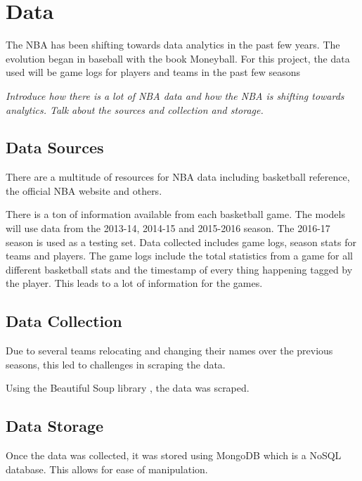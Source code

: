 \chapter{Data}\label{chapter:data}

The NBA has been shifting towards data analytics in the past few years.  The evolution began in baseball with the book Moneyball.  For this project, the data used will be game logs for players and teams in the past few seasons

\textit{Introduce how there is a lot of NBA data and how the NBA is shifting towards analytics.  Talk about the sources and collection and storage.}

\section{Data Sources}
There are a multitude of resources for NBA data including basketball reference, the official NBA website and others.

There is a ton of information available from each basketball game.  The models will use data from the 2013-14, 2014-15 and 2015-2016 season.  The 2016-17 season is used as a testing set.  Data collected includes game logs, season stats for teams and players.  The game logs include the total statistics from a game for all different basketball stats and the timestamp of every thing happening tagged by the player.  This leads to a lot of information for the games.

\section{Data Collection}

Due to several teams relocating and changing their names over the previous seasons, this led to challenges in scraping the data.

Using the Beautiful Soup library \cite{beautifulsoup}, the data was scraped.

\section{Data Storage}
Once the data was collected, it was stored using MongoDB which is a NoSQL database.  This allows for ease of manipulation.